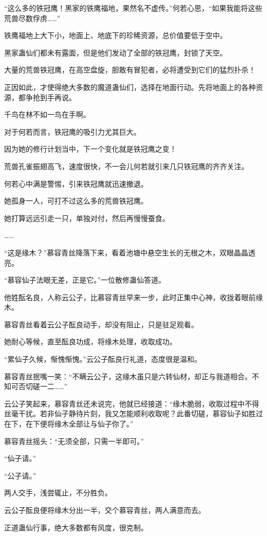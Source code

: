 \begin{this_body}
“这么多的铁冠鹰！黑家的铁鹰福地，果然名不虚传。”何若心思，“如果我能将这些荒兽尽数俘虏……”

铁鹰福地上大下小，地面上、地底下的珍稀资源，总价值要低于空中。

黑家蛊仙们都未有露面，但是他们发动了全部的铁冠鹰，封锁了天空。

大量的荒兽铁冠鹰，在高空盘旋，胆敢有冒犯者，必将遭受到它们的猛烈扑杀！

正因如此，才使得绝大多数的魔道蛊仙们，选择在地面行动。先将地面上的各种资源，都争抢到手再说。

千鸟在林不如一鸟在手啊。

对于何若而言，铁冠鹰的吸引力尤其巨大。

因为她的修行计划当中，下一个变化就是铁冠鹰之变！

荒兽孔雀振翅高飞，速度很快，不一会儿何若就引来几只铁冠鹰的齐齐关注。

何若心中满是警惕，引来铁冠鹰就迅速撤退。

她孤身一人，可打不过这么多的荒兽铁冠鹰。

她打算远远引走一只，单独对付，然后再慢慢蚕食。

……

“这是缘木？”慕容青丝降落下来，看着池塘中悬空生长的无根之木，双眼晶晶透亮。

“慕容仙子法眼无差，正是它。”一位散修蛊仙答道。

他姓酝名良，人称云公子，比慕容青丝早来一步，此时正集中心神，收拢着眼前缘木。

慕容青丝看着云公子酝良动手，却没有阻止，只是驻足观看。

她耐心等候，直至酝良功成，将缘木处理，收取成功。

“累仙子久候，惭愧惭愧。”云公子酝良行礼道，态度很是温和。

慕容青丝抿嘴一笑：“不瞒云公子，这缘木虽只是六转仙材，却正与我道相合。不知可否切磋一二……”

云公子笑起来，慕容青丝还未说完，他就已经接道：“缘木脆弱，收取过程中不得丝毫干扰。若非仙子静待片刻，我又怎能顺利收取呢？此番切磋，慕容仙子如胜过在下，在下便将缘木全部让与仙子你了。”

慕容青丝摇头：“无须全部，只需一半即可。”

“仙子请。”

“公子请。”

两人交手，浅尝辄止，不分胜负。

云公子酝良便将缘木分出一半，交个慕容青丝，两人满意而去。

正道蛊仙行事，绝大多数都有风度，很克制。


\end{this_body}
